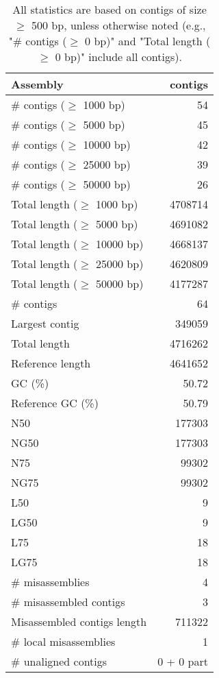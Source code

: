 \documentclass[12pt,a4paper]{article}
\begin{document}
\begin{table}[ht]
\begin{center}
\caption{All statistics are based on contigs of size $\geq$ 500 bp, unless otherwise noted (e.g., "\# contigs ($\geq$ 0 bp)" and "Total length ($\geq$ 0 bp)" include all contigs).}
\begin{tabular}{|l*{1}{|r}|}
\hline
Assembly & contigs \\ \hline
\# contigs ($\geq$ 1000 bp) & 54 \\ \hline
\# contigs ($\geq$ 5000 bp) & 45 \\ \hline
\# contigs ($\geq$ 10000 bp) & 42 \\ \hline
\# contigs ($\geq$ 25000 bp) & 39 \\ \hline
\# contigs ($\geq$ 50000 bp) & 26 \\ \hline
Total length ($\geq$ 1000 bp) & 4708714 \\ \hline
Total length ($\geq$ 5000 bp) & 4691082 \\ \hline
Total length ($\geq$ 10000 bp) & 4668137 \\ \hline
Total length ($\geq$ 25000 bp) & 4620809 \\ \hline
Total length ($\geq$ 50000 bp) & 4177287 \\ \hline
\# contigs & 64 \\ \hline
Largest contig & 349059 \\ \hline
Total length & 4716262 \\ \hline
Reference length & 4641652 \\ \hline
GC (\%) & 50.72 \\ \hline
Reference GC (\%) & 50.79 \\ \hline
N50 & 177303 \\ \hline
NG50 & 177303 \\ \hline
N75 & 99302 \\ \hline
NG75 & 99302 \\ \hline
L50 & 9 \\ \hline
LG50 & 9 \\ \hline
L75 & 18 \\ \hline
LG75 & 18 \\ \hline
\# misassemblies & 4 \\ \hline
\# misassembled contigs & 3 \\ \hline
Misassembled contigs length & 711322 \\ \hline
\# local misassemblies & 1 \\ \hline
\# unaligned contigs & 0 + 0 part \\ \hline

\end{tabular}
\end{center}
\end{table}
\end{document}

